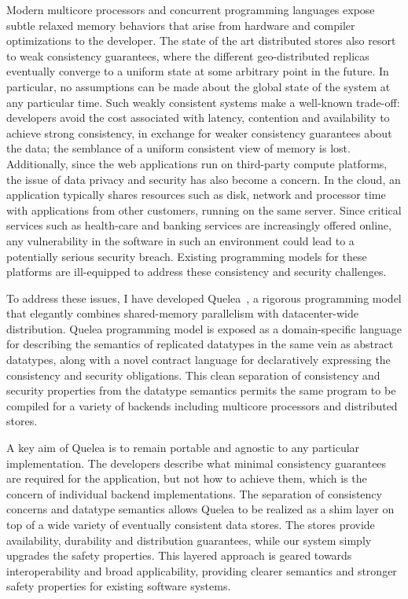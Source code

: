 \documentclass[screen,acmsmall,nonacm]{acmart}
\begin{document}
Modern multicore processors and concurrent programming languages expose subtle
relaxed memory behaviors that arise from hardware and compiler optimizations
to the developer. The state of the art distributed stores also resort to weak
consistency guarantees, where the different geo-distributed replicas eventually
converge to a uniform state at some arbitrary point in the future. In
particular, no assumptions can be made about the global state of the system at
any particular time. Such weakly consistent systems make a well-known
trade-off: developers avoid the cost associated with latency, contention and
availability to achieve strong consistency, in exchange for weaker consistency
guarantees about the data; the semblance of a uniform consistent view of memory
is lost. Additionally, since the web applications run on third-party compute
platforms, the issue of data privacy and security has also become a concern. In
the cloud, an application typically shares resources such as disk, network and
processor time with applications from other customers, running on the same
server. Since critical services such as health-care and banking services are
increasingly offered online, any vulnerability in the software in such an
environment could lead to a potentially serious security breach. Existing
programming models for these platforms are ill-equipped to address these
consistency and security challenges.

To address these issues, I have developed Quelea~\cite{quelea}, a rigorous
programming model that elegantly combines shared-memory parallelism with
datacenter-wide distribution. Quelea programming model is exposed as a
domain-specific language for describing the semantics of replicated datatypes
in the same vein as abstract datatypes, along with a novel contract language
for declaratively expressing the consistency and security obligations. This
clean separation of consistency and security properties from the datatype
semantics permits the same program to be compiled for a variety of backends
including multicore processors and distributed stores.

A key aim of Quelea is to remain portable and agnostic to any particular
implementation. The developers describe what minimal consistency guarantees are
required for the application, but not how to achieve them, which is the concern
of individual backend implementations. The separation of consistency concerns
and datatype semantics allows Quelea to be realized as a shim layer on top of a
wide variety of eventually consistent data stores. The stores provide
availability, durability and distribution guarantees, while our system simply
upgrades the safety properties. This layered approach is geared towards
interoperability and broad applicability, providing clearer semantics and
stronger safety properties for existing software systems.
\end{document}
